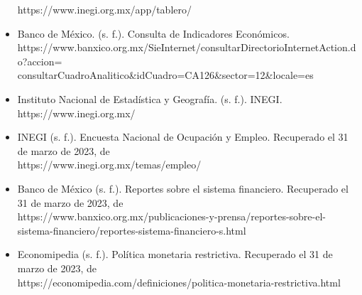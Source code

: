 \documentclass{article}
\theoremstyle{mytheoremstyle}
\theoremstyle{mytheoremstyle}
\theoremstyle{myproblemstyle}
\begin{document}
\begin{itemize}
  https://www.inegi.org.mx/app/tablero/
  \item Banco de México. (s. f.). Consulta de Indicadores Económicos.\\ 
  https://www.banxico.org.mx/SieInternet/consultarDirectorioInternetAction.do?accion=\\
        consultarCuadroAnalitico\&idCuadro=CA126\&sector=12\&locale=es
  \item Instituto Nacional de Estadística y Geografía. (s. f.). INEGI.\\ 
  https://www.inegi.org.mx/
  \item INEGI (s. f.). Encuesta Nacional de Ocupación y Empleo. Recuperado el 31 de marzo de 2023, de\\ 
  https://www.inegi.org.mx/temas/empleo/
  \item Banco de México (s. f.). Reportes sobre el sistema financiero. Recuperado el 31 de marzo de 2023, de\\ 
  https://www.banxico.org.mx/publicaciones-y-prensa/reportes-sobre-el-sistema-financiero/reportes-sistema-financiero-s.html
  \item Economipedia (s. f.). Política monetaria restrictiva. Recuperado el 31 de marzo de 2023, de\\ 
  https://economipedia.com/definiciones/politica-monetaria-restrictiva.html

\end{itemize}
\end{document}

